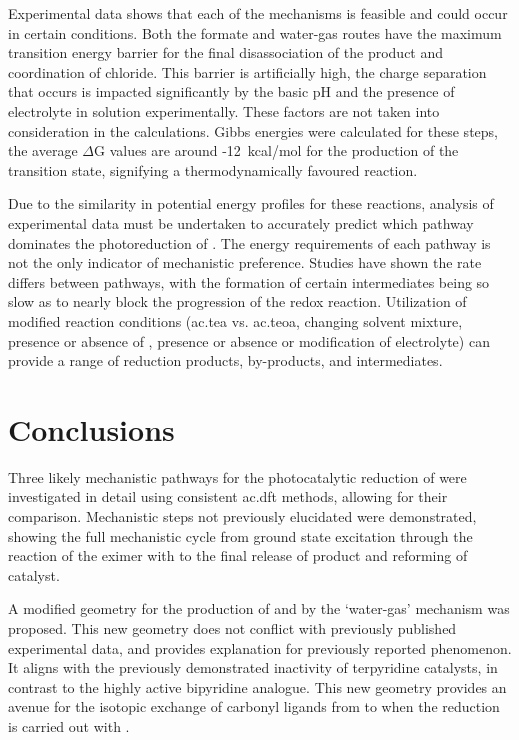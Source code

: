 Experimental data shows that each of the mechanisms is feasible and could occur in certain conditions. Both the formate and water-gas routes have the maximum transition energy barrier for the final disassociation of the product and coordination of chloride. This barrier is artificially high, the charge separation that occurs is impacted significantly by the basic pH and the presence of electrolyte in solution experimentally. These factors are not taken into consideration in the calculations. Gibbs energies were calculated for these steps, the average $\Delta$G values are around -12~kcal/mol for the production of the transition state, signifying a thermodynamically favoured reaction. 

Due to the similarity in potential energy profiles for these reactions, analysis of experimental data must be undertaken to accurately predict which pathway dominates the photoreduction of . The energy requirements of each pathway is not the only indicator of mechanistic preference. Studies have shown the rate differs between pathways, with the formation of certain intermediates being so slow as to nearly block the progression of the redox reaction. Utilization of modified reaction conditions (\gls{ac.tea} vs. \gls{ac.teoa}, changing solvent mixture, presence or absence of , presence or absence or modification of electrolyte) can provide a range of reduction products, by-products, and intermediates\autocite{hawecker1983, hawecker1986, sullivan1985, hayashi2003, morris2009, morimoto2013}.

\section{Conclusions} 

Three likely mechanistic pathways for the photocatalytic reduction of  were investigated in detail using consistent \gls{ac.dft} methods, allowing for their comparison. Mechanistic steps not previously elucidated were demonstrated, showing the full mechanistic cycle from ground state excitation through the reaction of the eximer with  to the final release of product and reforming of catalyst. 

A modified geometry for the production of  and  by the `water-gas' mechanism was proposed. This new geometry does not conflict with previously published experimental data, and provides explanation for previously reported phenomenon. It aligns with the previously demonstrated inactivity of terpyridine catalysts, in contrast to the highly active bipyridine analogue. This new geometry provides an avenue for the isotopic exchange of carbonyl ligands from  to  when the reduction is carried out with . 
